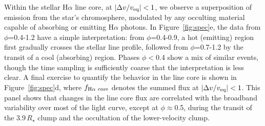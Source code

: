 \documentclass{nature3}
\begin{document}
Within the stellar H$\alpha$ line core, at $|\Delta v /
v_{\rm eq}|<1$, we observe a superposition of emission from the star's
chromosphere,
modulated by any occulting material capable of absorbing or
emitting H$\alpha$ photons.  In Figure~\ref{fig:spec}e, the data from
$\phi$=0.4-1.2 have a simple interpretation: from $\phi$=0.4-0.9, a hot
(emitting) region first gradually crosses the stellar line profile, followed from
$\phi$=0.7-1.2 by the transit of a cool (absorbing) region. Phases $\phi$$<$0.4
show a mix of similar events, though the time sampling is
sufficiently coarse that the interpretation is less clear.  A final
exercise to quantify the behavior in the line core is shown in
Figure~\ref{fig:spec}d, where $f_{\rm H\alpha\ core}$ denotes the
summed flux at $|\Delta v / v_{\rm eq}|<1$.  This panel shows that
changes in the line core flux are correlated with the
broadband variability over most of the light curve, except at
$\phi$$\approx$0.5, during the transit of the 3.9\,$R_\star$ clump and
the occultation of the lower-velocity clump.
\end{document}
